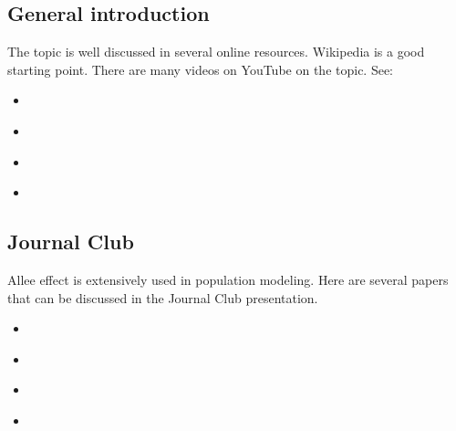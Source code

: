 \documentclass{article}
\begin{document}
\subsection{General introduction}
The topic is well discussed in several online resources. Wikipedia is a good starting point. There are many videos on YouTube on the topic. See:
\begin{itemize}
    \item \textcite{AgentBasedModel_Wiki}
    \item \textcite{AgentBasedModel_Macal2010}
    \item \textcite{AgentBasedModel_Macal2014}
    \item \textcite{AgentBasedModel_Sayama}
\end{itemize}

\subsection{Journal Club}
Allee effect is extensively used in population modeling. Here are several papers that can be discussed in the Journal Club presentation.
\begin{itemize}
    \item \textcite{AgentBasedModel_Ciunkiewicz2022} 
    \item \textcite{AgentBasedModel_Hunter2018}
    \item \textcite{AgentBasedModel_Nitzsche2024}
        \item \textcite{AgentBasedModel_Perez2009}
\end{itemize}



\printbibliography
\end{document}
